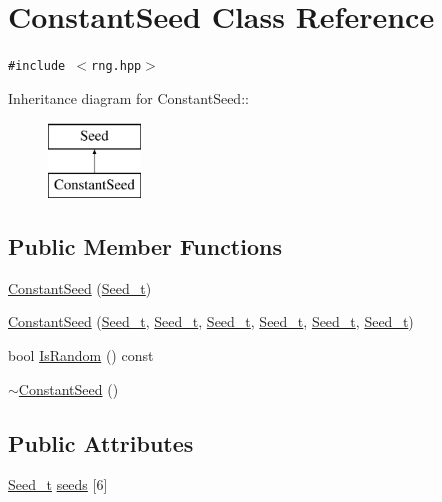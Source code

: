 \hypertarget{classConstantSeed}{
\section{ConstantSeed Class Reference}
\label{classConstantSeed}
}
{\tt \#include $<$rng.hpp$>$}

Inheritance diagram for ConstantSeed::\begin{figure}[H]
\begin{center}
\leavevmode
\includegraphics[height=2cm]{classConstantSeed}
\end{center}
\end{figure}
\subsection*{Public Member Functions}
\begin{CompactItemize}
\item 
\hyperlink{classConstantSeed_09dba071989c2d0d374c64c96cfdecc5}{ConstantSeed} (\hyperlink{rng_8hpp_d06dc1c21590adf4036ea4a265d06af8}{Seed\_\-t})
\item 
\hyperlink{classConstantSeed_b7706d24effc3222d0d284853d15b099}{ConstantSeed} (\hyperlink{rng_8hpp_d06dc1c21590adf4036ea4a265d06af8}{Seed\_\-t}, \hyperlink{rng_8hpp_d06dc1c21590adf4036ea4a265d06af8}{Seed\_\-t}, \hyperlink{rng_8hpp_d06dc1c21590adf4036ea4a265d06af8}{Seed\_\-t}, \hyperlink{rng_8hpp_d06dc1c21590adf4036ea4a265d06af8}{Seed\_\-t}, \hyperlink{rng_8hpp_d06dc1c21590adf4036ea4a265d06af8}{Seed\_\-t}, \hyperlink{rng_8hpp_d06dc1c21590adf4036ea4a265d06af8}{Seed\_\-t})
\item 
bool \hyperlink{classConstantSeed_38790f9390c6c4d6d27a2f60f1df438f}{IsRandom} () const 
\item 
\hyperlink{classConstantSeed_4c1bc70217c0522c76ebad617bd95f0d}{$\sim$ConstantSeed} ()
\end{CompactItemize}
\subsection*{Public Attributes}
\begin{CompactItemize}
\item 
\hyperlink{rng_8hpp_d06dc1c21590adf4036ea4a265d06af8}{Seed\_\-t} \hyperlink{classConstantSeed_10cdd2d1933e1af94162477edcad0352}{seeds} \mbox{[}6\mbox{]}
\end{CompactItemize}


